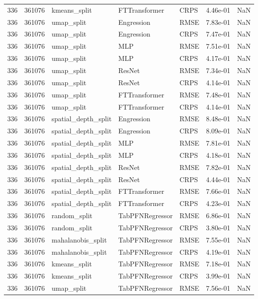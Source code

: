 \begin{tabular}{rrlllrr}
336 & 361076 & kmeans\_split & FTTransformer & CRPS & 4.46e-01 & NaN \\
336 & 361076 & umap\_split & Engression & RMSE & 7.83e-01 & NaN \\
336 & 361076 & umap\_split & Engression & CRPS & 7.47e-01 & NaN \\
336 & 361076 & umap\_split & MLP & RMSE & 7.51e-01 & NaN \\
336 & 361076 & umap\_split & MLP & CRPS & 4.17e-01 & NaN \\
336 & 361076 & umap\_split & ResNet & RMSE & 7.34e-01 & NaN \\
336 & 361076 & umap\_split & ResNet & CRPS & 4.14e-01 & NaN \\
336 & 361076 & umap\_split & FTTransformer & RMSE & 7.48e-01 & NaN \\
336 & 361076 & umap\_split & FTTransformer & CRPS & 4.14e-01 & NaN \\
336 & 361076 & spatial\_depth\_split & Engression & RMSE & 8.48e-01 & NaN \\
336 & 361076 & spatial\_depth\_split & Engression & CRPS & 8.09e-01 & NaN \\
336 & 361076 & spatial\_depth\_split & MLP & RMSE & 7.81e-01 & NaN \\
336 & 361076 & spatial\_depth\_split & MLP & CRPS & 4.18e-01 & NaN \\
336 & 361076 & spatial\_depth\_split & ResNet & RMSE & 7.82e-01 & NaN \\
336 & 361076 & spatial\_depth\_split & ResNet & CRPS & 4.44e-01 & NaN \\
336 & 361076 & spatial\_depth\_split & FTTransformer & RMSE & 7.66e-01 & NaN \\
336 & 361076 & spatial\_depth\_split & FTTransformer & CRPS & 4.23e-01 & NaN \\
336 & 361076 & random\_split & TabPFNRegressor & RMSE & 6.86e-01 & NaN \\
336 & 361076 & random\_split & TabPFNRegressor & CRPS & 3.80e-01 & NaN \\
336 & 361076 & mahalanobis\_split & TabPFNRegressor & RMSE & 7.55e-01 & NaN \\
336 & 361076 & mahalanobis\_split & TabPFNRegressor & CRPS & 4.19e-01 & NaN \\
336 & 361076 & kmeans\_split & TabPFNRegressor & RMSE & 7.18e-01 & NaN \\
336 & 361076 & kmeans\_split & TabPFNRegressor & CRPS & 3.99e-01 & NaN \\
336 & 361076 & umap\_split & TabPFNRegressor & RMSE & 7.56e-01 & NaN \\

\end{tabular}
